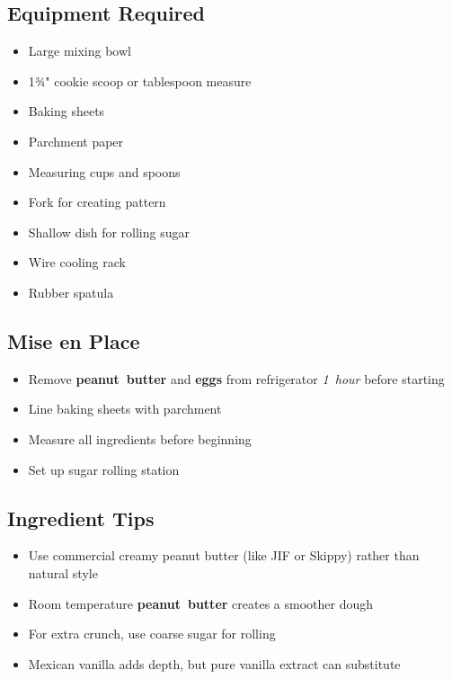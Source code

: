 \documentclass[11pt,letterpaper]{article}
\begin{document}
\newpage

{\small
\setlength{\columnsep}{20pt}
\setlength{\multicolsep}{6pt}
\begin{multicols}{2}
\setlength{\parindent}{0pt}
\setlength{\parskip}{4pt}

\subsection*{Equipment Required}
\begin{itemize}
    \item Large mixing bowl
    \item 1¾" cookie scoop or tablespoon measure
    \item Baking sheets
    \item Parchment paper
    \item Measuring cups and spoons
    \item Fork for creating pattern
    \item Shallow dish for rolling sugar
    \item Wire cooling rack
    \item Rubber spatula
\end{itemize}

\subsection*{Mise en Place}
\begin{itemize}
    \item Remove \textbf{peanut~butter} and \textbf{eggs} from refrigerator \textit{1~hour} before starting
    \item Line baking sheets with parchment
    \item Measure all ingredients before beginning
    \item Set up sugar rolling station
\end{itemize}

\subsection*{Ingredient Tips}
\begin{itemize}
    \item Use commercial creamy peanut butter (like JIF or Skippy) rather than natural style
    \item Room temperature \textbf{peanut~butter} creates a smoother dough
    \item For extra crunch, use coarse sugar for rolling
    \item Mexican vanilla adds depth, but pure vanilla extract can substitute
\end{itemize}


\end{multicols}}
\end{document}
